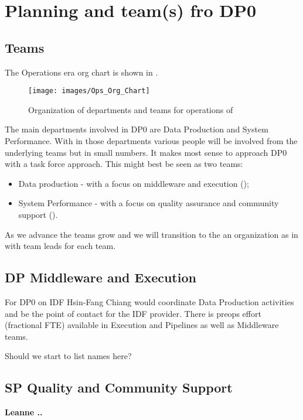 \section{Planning and team(s) fro DP0} \label{sec:plan}


\subsection {Teams}

The Operations era org chart is shown in .


\begin{figure}
\texttt{[image: images/Ops\_Org\_Chart]}
\caption{ Organization of departments and teams  for operations of \RO \label{fig:org}}
\end{figure}

The main departments involved in DP0 are Data Production and System Performance. With in those departments various people will be involved from the underlying teams but in small numbers. It makes most sense to approach DP0 with a task force approach. This might best be seen as two teams:

\begin{itemize}
\item Data production - with a focus on middleware and execution ();
\item System Performance - with a focus on quality assurance and community support ().
\end{itemize}

As we advance the teams grow and we will transition to the an organization as in 
with team leads for each team.

\subsection{DP Middleware and Execution}\label{sec:dp}
For DP0 on IDF Hsin-Fang Chiang would coordinate Data Production activities and be the point
of contact for the IDF provider.
There is preops effort (fractional FTE) available in Execution and Pipelines as well as Middleware teams.

{\color{red} Should we start to list names here?}

\subsection{SP Quality  and Community Support} \label{sec:sp}

{\bf Leanne .. }
